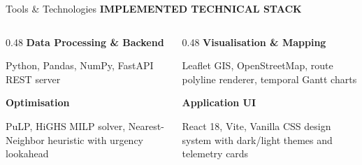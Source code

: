 \documentclass[aspectratio=169,10pt]{beamer}
\newcommand{\sectiontag}[1]{%
    {\scriptsize\bfseries\color{Accent}\MakeUppercase{#1}}\par\vspace{0.08cm}
}
\begin{document}
\begin{frame}{Tools \& Technologies}
\sectiontag{Implemented Technical Stack}


\vspace{0.1cm}

\begin{columns}[T,totalwidth=\textwidth]

    \begin{column}{0.48\textwidth}
        {\bfseries\color{Primary}\small Data Processing \& Backend}
        \par\vspace{0.06cm}
        \footnotesize
        Python, Pandas, NumPy, FastAPI REST server

        \vspace{0.45cm}

        {\bfseries\color{Primary}\small Optimisation}
        \par\vspace{0.06cm}
        \footnotesize
        PuLP, HiGHS MILP solver, Nearest-Neighbor heuristic with urgency lookahead
    \end{column}

    \begin{column}{0.48\textwidth}
        {\bfseries\color{Primary}\small Visualisation \& Mapping}
        \par\vspace{0.06cm}
        \footnotesize
        Leaflet GIS, OpenStreetMap, route polyline renderer, temporal Gantt charts

        \vspace{0.45cm}

        {\bfseries\color{Primary}\small Application UI}
        \par\vspace{0.06cm}
        \footnotesize
        React 18, Vite, Vanilla CSS design system with dark/light themes and telemetry cards
    \end{column}

\end{columns}

\vfill
\end{frame}

\end{document}
